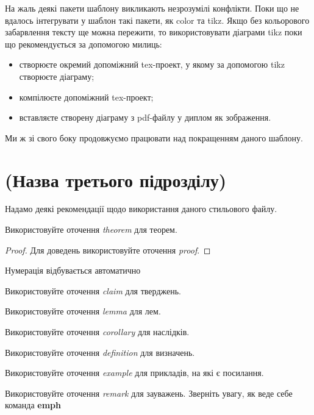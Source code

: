 На жаль деякі пакети шаблону викликають незрозумілі конфлікти. Поки що не
вдалось інтегрувати у шаблон такі пакети, як color та tikz. Якщо без
кольорового забарвлення тексту ще можна пережити, то використовувати
діаграми tikz поки що рекомендується за допомогою милиць:

\begin{itemize}
    \item створюєте окремий допоміжний tex-проект, у якому за допомогою tikz створюєте
          діаграму;
    \item компілюєте допоміжний tex-проект;
    \item вставляєте створену діаграму з pdf-файлу у диплом як зображення.
\end{itemize}

Ми ж зі свого боку продовжуємо працювати над покращенням даного шаблону.

\section{(Назва третього підрозділу)}

Надамо деякі рекомендації щодо використання даного стильового файлу.

\begin{theorem}
    Використовуйте оточення \emph{theorem} для теорем.
\end{theorem}
\begin{proof}
    Для доведень використовуйте оточення \emph{proof}.
\end{proof}
\begin{theorem}
    Нумерація відбувається автоматично
\end{theorem}
\begin{claim}
    Використовуйте оточення \emph{claim} для тверджень.
\end{claim}
\begin{lemma}
    Використовуйте оточення \emph{lemma} для лем.
\end{lemma}
\begin{corollary}
    Використовуйте оточення \emph{corollary} для наслідків.
\end{corollary}
\begin{definition}
    Використовуйте оточення \emph{definition} для визначень.
\end{definition}
\begin{example}
    Використовуйте оточення \emph{example} для прикладів, на які є посилання.
\end{example}
\begin{remark}
    Використовуйте оточення \emph{remark} для зауважень. Зверніть увагу, як
    веде себе команда \textbf{emph}
\end{remark}

